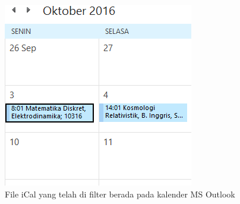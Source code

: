 \begin{enumerate}
			\begin{figure}[H]
			\centering
			\includegraphics[scale=0.8]{Gambar/hasilOutlookFilterEksperimental}
			\caption{File iCal yang telah di filter berada pada kalender MS Outlook}
			\label{fig:hasilOutlookFilter}
			\end{figure}
			
\end{enumerate} 
